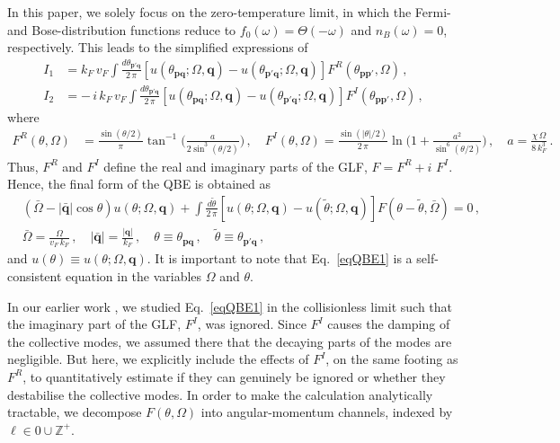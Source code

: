 \documentclass[aps, prb, onecolumn, nofootinbib, citeautoscript, 10pt]{revtex4-2}
\def \nn{\nonumber \\}
\newcommand{\bp}{\mathbf{p}}
\newcommand{\bq}{\mathbf{q}}
\newcommand{\bbq}{|\bar{\mathbf{q}}|}
\begin{document}
In this paper, we solely focus on the zero-temperature limit, in which the Fermi- and Bose-distribution functions reduce to $f_0(\omega)=\Theta(-\omega)$ and $ n_B(\omega)=0$, respectively. This leads to the simplified expressions of
\begin{align}
I_1  & = k_F \, v_F \int \frac{d\theta_{\bp'\bq}}{ 2 \, \pi } 
\left[u(\theta_{\bp\bq};  \Omega, \bq )-u(\theta_{\bp'\bq};  \Omega, \bq )\right]
F^R(\theta_{\bp\bp'},\Omega)\,, \nn
I_2  & = - \, i \, k_F \, v_F  \int \frac{d\theta_{\bp'\bq}}{ 2 \, \pi } 
\left[u(\theta_{\bp\bq};  \Omega, \bq )-u(\theta_{\bp'\bq};  \Omega, \bq )\right] 
F^I(\theta_{\bp\bp'},\Omega)\,,
\label{eqI1I2}
\end{align}
where
\begin{align}
\label{F-eq} 
F^R(\theta,\Omega)
& =\frac{\sin ({\theta} / {2} )}{\pi} 
\tan^{-1}\bigg(\frac{a}
{2 \sin^3 ({\theta} /{2})}  \bigg)  \,, \quad
F^I(\theta,\Omega)  =
\frac{\sin (|\theta|/2)} {2 \,\pi} 
\ln \Big(1 +  \frac{a^2} { \sin^6 (\theta/2)} \Big)\,,
\quad  a =\frac{\chi \,\Omega}{8 \,k_F^3}\,.
\end{align}
Thus, $F^R$ and $F^I$ define the real and imaginary parts of the GLF, $F=  F^R +  i \, \, F^I$. Hence, the final form of the QBE is obtained as
\begin{align}
& \left(\bar{\Omega}- \bbq \cos\theta\right) u(\theta ;\Omega,\bq )
+  \int \frac{d \tilde \theta} { 2\, \pi }  
\left[ u(\theta ;\Omega,\bq)- u( \tilde \theta ;\Omega,\bq ) \right] 
F(\theta-\tilde \theta,\bar{\Omega}) = 0\,, 
\nn & \bar{\Omega}= \frac{\Omega} {v_F \,k_F} \,, \quad
	\bbq =\frac{ |\bq| } { k_F} \,, \quad
	\theta \equiv\theta_{\bp \bq} \,, \quad
	\tilde \theta \equiv \theta_{\bp' \bq}\,,
	\label{eqQBE1}
\end{align}
and $u(\theta)\equiv u(\theta;\Omega,\bq)$. It is important to note that Eq.~\eqref{eqQBE1} is a self-consistent equation in the variables $\Omega$ and $\theta$.




In our earlier work \cite{ips-kazi}, we studied Eq.~\eqref{eqQBE1} in the collisionless limit such that the imaginary part of the GLF, $F^I$, was ignored. Since $F^I$ causes the damping of the collective modes, we assumed there that the decaying parts of the modes are negligible. But here, we explicitly include the effects of $F^I$, on the same footing as $ F^R $, to quantitatively estimate if they can genuinely be ignored or whether they destabilise the collective modes. 
In order to make the calculation analytically tractable, we decompose $F(\theta,\Omega)$ into angular-momentum channels, indexed by $\ell \in 0 \cup \mathbb{Z}^+$. 
\end{document}
